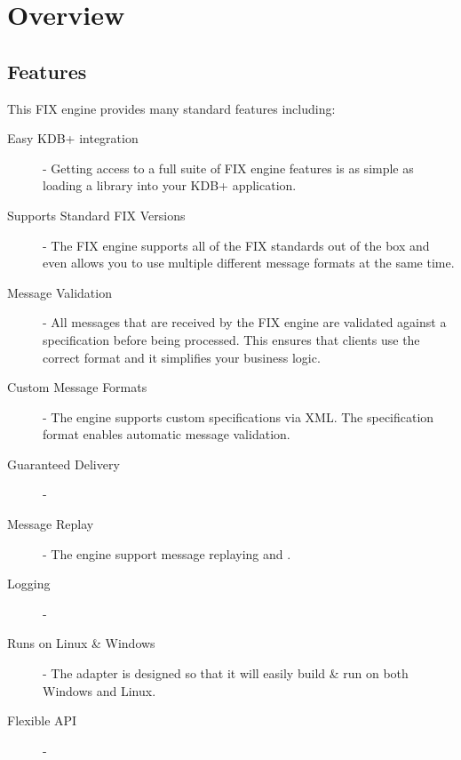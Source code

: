 \chapter{Overview}

\section{Features}

This FIX engine provides many standard features including:

\begin{description}
	\item[Easy KDB+ integration] - Getting access to a full suite of FIX engine features is as simple as loading a library into your KDB+ application.
	\item[Supports Standard FIX Versions] - The FIX engine supports all of the FIX standards out of the box and even allows you to use multiple different message formats at the same time.
	\item[Message Validation] - All messages that are received by the FIX engine are validated against a specification before being processed. This ensures that clients use the correct format and it simplifies your business logic.
	\item[Custom Message Formats] - The engine supports custom specifications via XML. The specification format enables automatic message validation.
	\item[Guaranteed Delivery] -
	\item[Message Replay] - The engine support message replaying and .
	\item[Logging] - 
	\item[Runs on Linux \& Windows] - The adapter is designed so that it will easily build \& run on both Windows and Linux.
	\item[Flexible API] -
\end{description}
